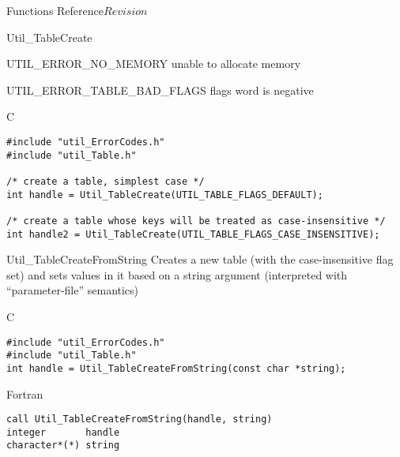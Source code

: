 \begin{cactuspart}{ Functions Reference}{}{$Revision$}
\begin{FunctionDescription}{Util\_TableCreate}
\begin{ErrorSection}
\begin{Error}{UTIL\_ERROR\_NO\_MEMORY}
unable to allocate memory
\end{Error}
\begin{Error}{UTIL\_ERROR\_TABLE\_BAD\_FLAGS}
flags word is negative
\end{Error}
\end{ErrorSection}

\begin{ExampleSection}
\begin{Example}{C}
\begin{verbatim}
#include "util_ErrorCodes.h"
#include "util_Table.h"

/* create a table, simplest case */
int handle = Util_TableCreate(UTIL_TABLE_FLAGS_DEFAULT);

/* create a table whose keys will be treated as case-insensitive */
int handle2 = Util_TableCreate(UTIL_TABLE_FLAGS_CASE_INSENSITIVE);
\end{verbatim}
\end{Example}
\end{ExampleSection}
\end{FunctionDescription}


\begin{FunctionDescription}{Util\_TableCreateFromString}
\label{Util-TableCreateFromString}
Creates a new table (with the case-insensitive flag set) and sets
values in it based on a string argument (interpreted with
``parameter-file'' semantics)

\begin{SynopsisSection}
\begin{Synopsis}{C}
\begin{verbatim}
#include "util_ErrorCodes.h"
#include "util_Table.h"
int handle = Util_TableCreateFromString(const char *string);
\end{verbatim}
\end{Synopsis}
\begin{Synopsis}{Fortran}
\begin{verbatim}
call Util_TableCreateFromString(handle, string)
integer       handle
character*(*) string
\end{verbatim}
\end{Synopsis}
\end{SynopsisSection}


\end{FunctionDescription}
\end{cactuspart}
